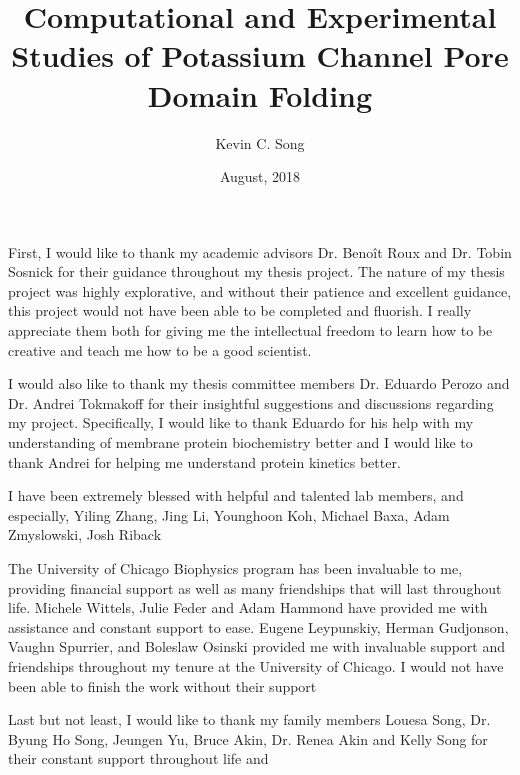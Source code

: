 \documentclass{ucetd}
\title{Computational and Experimental Studies of Potassium Channel Pore Domain Folding}
\author{Kevin C. Song}
\date{August, 2018}
\begin{document}
\maketitle

\makecopyright
\makededication
\makeepigraph


\tableofcontents
\listoffigures
\listoftables

\acknowledgments
First, I would like to thank my academic advisors Dr. Beno\^{i}t Roux and Dr. Tobin Sosnick for their guidance throughout my thesis project. The nature of my thesis project was highly explorative, and without their patience and excellent guidance, this project would not have been able to be completed and fluorish. I really appreciate them both for giving me the intellectual freedom to learn how to be creative and teach me how to be a good scientist. \par

I would also like to thank my thesis committee members Dr. Eduardo Perozo and Dr. Andrei Tokmakoff for their insightful suggestions and discussions regarding my project. Specifically, I would like to thank Eduardo for his help with my understanding of membrane protein biochemistry better and I would like to thank Andrei for helping me understand protein kinetics better. \par

I have been extremely blessed with helpful and talented lab members, and especially, Yiling Zhang, Jing Li, Younghoon Koh, Michael Baxa, Adam Zmyslowski, Josh Riback \par

The University of Chicago Biophysics program has been invaluable to me, providing financial support as well as many friendships that will last throughout life. Michele Wittels, Julie Feder and Adam Hammond have provided me with assistance and constant support to ease. Eugene Leypunskiy, Herman Gudjonson, Vaughn Spurrier, and Boleslaw Osinski provided me with invaluable support and friendships throughout my tenure at the University of Chicago. I would not have been able to finish the work without their support \par

Last but not least, I would like to thank my family members Louesa Song, Dr. Byung Ho Song, Jeungen Yu, Bruce Akin, Dr. Renea Akin and Kelly Song for their constant support throughout life and 
\end{document}
